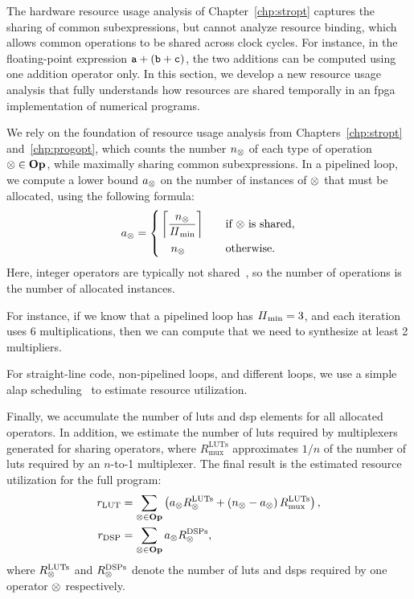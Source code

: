 The hardware resource usage analysis of Chapter~\ref{chp:stropt} captures the
sharing of common subexpressions, but cannot analyze resource binding, which
allows common operations to be shared across clock cycles. For instance, in
the floating-point expression $\texttt{a} + (\texttt{b} + \texttt{c})$, the two additions can
be computed using one addition operator only.  In this section, we develop a
new resource usage analysis that fully understands how resources are shared
temporally in an \gls{fpga} implementation of numerical programs.

We rely on the foundation of resource usage analysis from
Chapters~\ref{chp:stropt} and~\ref{chp:progopt}, which counts the number
$n_\otimes$ of each type of operation $\otimes \in \mathbf{Op}$, while maximally
sharing common subexpressions.  In a pipelined loop, we compute a lower bound
$a_\otimes$ on the number of instances of $\otimes$ that must be allocated,
using the following formula:
\begin{equation}
    a_\otimes = \left\{
        \begin{aligned}
            & \left\lceil \frac{n_\otimes}{\mathit{II}_{\rm min}} \right\rceil
            && \quad \text{if $\otimes$ is shared}, \\
            & \quad n_\otimes
            && \quad \text{otherwise}.
        \end{aligned}
    \right.
\end{equation}
Here, integer operators are typically not shared~\cite{cong15}, so the number
of operations is the number of allocated instances.

For instance, if we know that a pipelined loop has $\mathit{II}_{\rm min} = 3$, and each
iteration uses 6 multiplications, then we can compute that we need to
synthesize at least 2 multipliers.

For straight-line code, non-pipelined loops, and different loops, we use a
simple \gls{alap} scheduling~\cite{wang_hls} to estimate resource utilization.

Finally, we accumulate the number of \glspl{lut} and \gls{dsp} elements
for all allocated operators.  In addition, we estimate the number of
\glspl{lut} required by multiplexers generated for sharing operators, where
$R^\mathrm{LUTs}_\mathrm{mux}$ approximates $1/n$ of the number of \glspl{lut}
required by an $n$-to-1 multiplexer.  The final result is the estimated
resource utilization for the full program:
\begin{equation}
    \begin{aligned}
        r_\mathrm{LUT} &=
            \sum_{\otimes \in \mathbf{Op}} \left(
                a_\otimes R^\mathrm{LUTs}_\otimes +
                \left( n_\otimes - a_\otimes \right)
                    R^\mathrm{LUTs}_\mathrm{mux}
            \right), \\
        r_\mathrm{DSP} &=
            \sum_{\otimes \in \mathbf{Op}} a_\otimes R^\mathrm{DSPs}_\otimes,
    \end{aligned}
\end{equation}
where $R^\mathrm{LUTs}_\otimes$ and $R^\mathrm{DSPs}_\otimes$ denote the
number of \glspl{lut} and \glspl{dsp} required by one operator $\otimes$
respectively.


